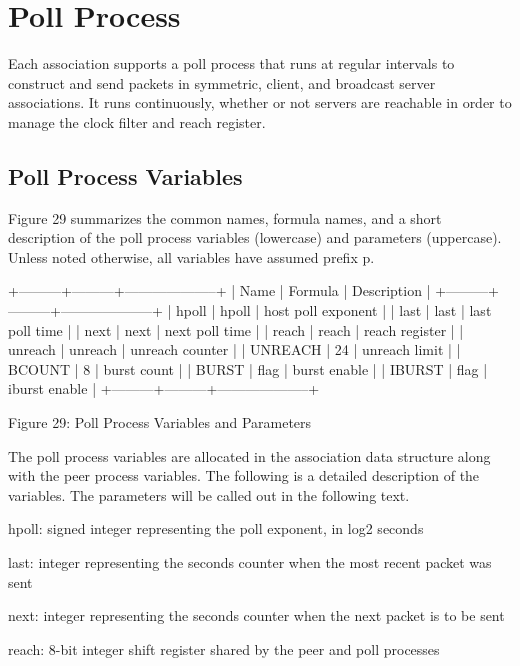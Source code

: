 \chapter{Poll Process}

Each association supports a poll process that runs at regular
intervals to construct and send packets in symmetric, client, and
broadcast server associations.  It runs continuously, whether or not
servers are reachable in order to manage the clock filter and reach
register.

\section{Poll Process Variables}

Figure 29 summarizes the common names, formula names, and a short
description of the poll process variables (lowercase) and parameters
(uppercase).  Unless noted otherwise, all variables have assumed
prefix p.

                +---------+---------+--------------------+
                | Name    | Formula | Description        |
                +---------+---------+--------------------+
                | hpoll   | hpoll   | host poll exponent |
                | last    | last    | last poll time     |
                | next    | next    | next poll time     |
                | reach   | reach   | reach register     |
                | unreach | unreach | unreach counter    |
                | UNREACH | 24      | unreach limit      |
                | BCOUNT  | 8       | burst count        |
                | BURST   | flag    | burst enable       |
                | IBURST  | flag    | iburst enable      |
                +---------+---------+--------------------+

          Figure 29: Poll Process Variables and Parameters

The poll process variables are allocated in the association data
structure along with the peer process variables.  The following is a
detailed description of the variables.  The parameters will be called
out in the following text.

hpoll: signed integer representing the poll exponent, in log2 seconds

last: integer representing the seconds counter when the most recent
packet was sent

next: integer representing the seconds counter when the next packet
is to be sent

reach: 8-bit integer shift register shared by the peer and poll
processes

